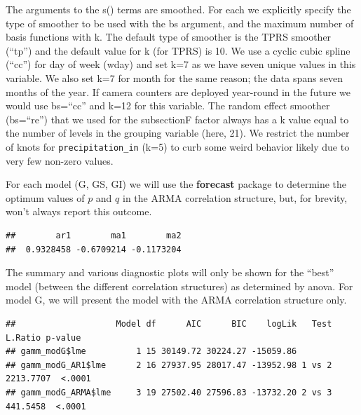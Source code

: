 \documentclass[
]{book}
\newenvironment{Shaded}{\begin{snugshade}}{\end{snugshade}}
\newcommand{\AttributeTok}[1]{\textcolor[rgb]{0.77,0.63,0.00}{#1}}
\newcommand{\DocumentationTok}[1]{\textcolor[rgb]{0.56,0.35,0.01}{\textbf{\textit{#1}}}}
\newcommand{\FunctionTok}[1]{\textcolor[rgb]{0.00,0.00,0.00}{#1}}
\newcommand{\NormalTok}[1]{#1}
\newcommand{\OtherTok}[1]{\textcolor[rgb]{0.56,0.35,0.01}{#1}}
\newcommand{\SpecialCharTok}[1]{\textcolor[rgb]{0.00,0.00,0.00}{#1}}
\newcommand{\StringTok}[1]{\textcolor[rgb]{0.31,0.60,0.02}{#1}}
\begin{document}
The arguments to the s() terms are smoothed. For each we explicitly specify the type of smoother to be used with the bs argument, and the maximum number of basis functions with k. The default type of smoother is the TPRS smoother (``tp'') and the default value for k (for TPRS) is 10. We use a cyclic cubic spline (``cc'') for day of week (wday) and set k=7 as we have seven unique values in this variable. We also set k=7 for month for the same reason; the data spans seven months of the year. If camera counters are deployed year-round in the future we would use bs=``cc'' and k=12 for this variable. The random effect smoother (bs=``re'') that we used for the subsectionF factor always has a k value equal to the number of levels in the grouping variable (here, 21). We restrict the number of knots for \texttt{precipitation\_in} (k=5) to curb some weird behavior likely due to very few non-zero values.

For each model (G, GS, GI) we will use the \textbf{forecast} package to determine the optimum values of \(p\) and \(q\) in the ARMA correlation structure, but, for brevity, won't always report this outcome.

\begin{Shaded}
\end{Shaded}

\begin{verbatim}
##        ar1        ma1        ma2 
##  0.9328458 -0.6709214 -0.1173204
\end{verbatim}

The summary and various diagnostic plots will only be shown for the ``best'' model (between the different correlation structures) as determined by anova. For model G, we will present the model with the ARMA correlation structure only.

\begin{verbatim}
##                    Model df      AIC      BIC    logLik   Test   L.Ratio p-value
## gamm_modG$lme          1 15 30149.72 30224.27 -15059.86                         
## gamm_modG_AR1$lme      2 16 27937.95 28017.47 -13952.98 1 vs 2 2213.7707  <.0001
## gamm_modG_ARMA$lme     3 19 27502.40 27596.83 -13732.20 2 vs 3  441.5458  <.0001
\end{verbatim}
\end{document}
